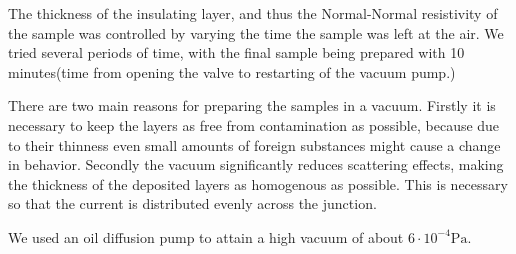 The thickness of the insulating layer, and thus the Normal-Normal resistivity of the sample was controlled by varying the time the sample was left at the air. We tried several periods of time, with the final sample being prepared with 10 minutes(time from opening the valve to restarting of the vacuum pump.)

There are two main reasons for preparing the samples in a vacuum. Firstly it is necessary to keep the layers as free from contamination as possible, because due to their thinness even small amounts of foreign substances might cause a change in behavior. Secondly the vacuum significantly reduces scattering effects, making the thickness of the deposited layers as homogenous as possible. This is necessary so that the current is distributed evenly across the junction.

We used an oil diffusion pump to attain a high vacuum of about $6\cdot10^{-4}\text{Pa}$.
